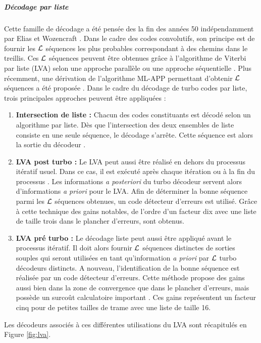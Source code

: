 \subparagraph{Décodage par liste} Cette famille de décodage a été pensée des la fin des années 50 indépendamment par Elias 
et Wozencraft \cite{elias1957list,wozencraft1958list}. Dans le cadre des codes convolutifs, son principe est de fournir 
les $\cal{L}$ séquences les plus probables correspondant à des chemins dans le treillis. Ces $\cal{L}$ séquences peuvent 
être obtenues grâce à l'algorithme de Viterbi par liste (LVA) selon une approche parallèle ou une approche séquentielle 
\cite{lva}. Plus récemment, une dérivation de l'algorithme ML-APP permettant d'obtenir $\cal{L}$ séquences a été proposée 
\cite{mlla}.
Dans le cadre du décodage de turbo codes par liste, trois principales approches peuvent être appliquées :
\begin{enumerate}
	\item \textbf{Intersection de liste : } Chacun des codes constituants est décodé selon un algorithme par liste. Dès 
	que l'intersection des deux ensembles de liste consiste en une seule séquence, le décodage s'arrête. Cette séquence 
	est alors la sortie du décodeur \cite{sadowPair}. 
	\item \textbf{LVA post turbo : }  Le LVA peut aussi être réalisé en dehors du processus itératif usuel. Dans ce cas, 
	il est exécuté après chaque itération ou à la fin du processus \cite{narayaList}. Les informations \textit{a posteriori} 
	du turbo décodeur servent alors d'informations \textit{a priori} pour le LVA. Afin de déterminer la bonne séquence 
	parmi les $\cal{L}$ séquences obtenues, un code détecteur d'erreurs est utilisé. Grâce à cette technique des gains 
	notables, de l'ordre d'un facteur dix avec une liste de taille trois dans le plancher d'erreurs, sont obtenus.
	\item \textbf{LVA pré turbo : } Le décodage liste peut aussi être appliqué avant le processus itératif. Il doit alors 
	fournir $\cal{L}$ séquences distinctes de sorties souples qui seront utilisées en tant qu'information \textit{a priori} 
	par $\cal{L}$ turbo décodeurs distincts. A nouveau, l'identification de la bonne séquence est réalisée par un code 
	détecteur d'erreurs. Cette méthode propose des gains aussi bien dans la zone de convergence que dans le plancher 
	d'erreurs, mais possède un surcoût calculatoire important \cite{newList}. Ces gains représentent un facteur cinq pour 
	de petites tailles de trame avec une liste de taille 16.
\end{enumerate}

Les décodeurs associés à ces différentes utilisations du LVA sont récapitulés en Figure \ref{fig:lva}. 


